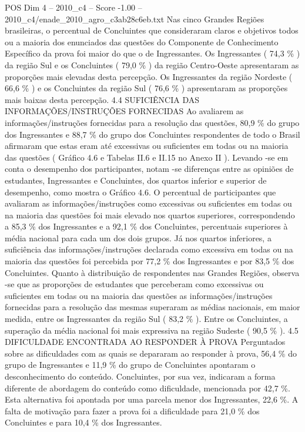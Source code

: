 \begin{textsample}{POS Dim 4 – 2010\_c4 – Score -1.00 – 2010\_c4/enade\_2010\_agro\_c3ab28c6eb.txt}
Nas cinco Grandes Regiões brasileiras, o percentual de Concluintes que consideraram claros e objetivos todos ou a maioria dos enunciados das questões do Componente de Conhecimento Específico da prova foi maior do que o de Ingressantes.
Os Ingressantes ( 74,3 \% ) da região Sul e os Concluintes ( 79,0 \% ) da região Centro-Oeste apresentaram as proporções mais elevadas desta percepção.
Os Ingressantes da região Nordeste ( 66,6 \% ) e os Concluintes da região Sul ( 76,6 \% ) apresentaram as proporções mais baixas desta percepção. 4.4 SUFICIÊNCIA DAS INFORMAÇÕES/INSTRUÇÕES FORNECIDAS Ao avaliarem as informações/instruções fornecidas para a resolução das questões, 80,9 \% do grupo dos Ingressantes e 88,7 \% do grupo dos Concluintes respondentes de todo o Brasil afirmaram que estas eram até excessivas ou suficientes em todas ou na maioria das questões ( Gráfico 4.6 e Tabelas II.6 e II.15 no Anexo II ).
Levando -se em conta o desempenho dos participantes, notam -se diferenças entre as opiniões de estudantes, Ingressantes e Concluintes, dos quartos inferior e superior de desempenho, como mostra o Gráfico 4.6.
O percentual de participantes que avaliaram as informações/instruções como excessivas ou suficientes em todas ou na maioria das questões foi mais elevado nos quartos superiores, correspondendo a 85,3 \% dos Ingressantes e a 92,1 \% dos Concluintes, percentuais superiores à média nacional para cada um dos dois grupos.
Já nos quartos inferiores, a suficiência das informações/instruções declarada como excessiva em todas ou na maioria das questões foi percebida por 77,2 \% dos Ingressantes e por 83,5 \% dos Concluintes.
Quanto à distribuição de respondentes nas Grandes Regiões, observa -se que as proporções de estudantes que perceberam como excessivas ou suficientes em todas ou na maioria das questões as informações/instruções fornecidas para a resolução das mesmas superaram as médias nacionais, em maior medida, entre os Ingressantes da região Sul ( 83,2 \% ).
Entre os Concluintes, a superação da média nacional foi mais expressiva na região Sudeste ( 90,5 \% ). 4.5 DIFICULDADE ENCONTRADA AO RESPONDER À PROVA Perguntados sobre as dificuldades com as quais se depararam ao responder à prova, 56,4 \% do grupo de Ingressantes e 11,9 \% do grupo de Concluintes apontaram o desconhecimento do conteúdo.
Concluintes, por sua vez, indicaram a forma diferente de abordagem do conteúdo como dificuldade, mencionada por 42,7 \%.
Esta alternativa foi apontada por uma parcela menor dos Ingressantes, 22,6 \%.
A falta de motivação para fazer a prova foi a dificuldade para 21,0 \% dos Concluintes e para 10,4 \% dos Ingressantes.

\end{textsample}
